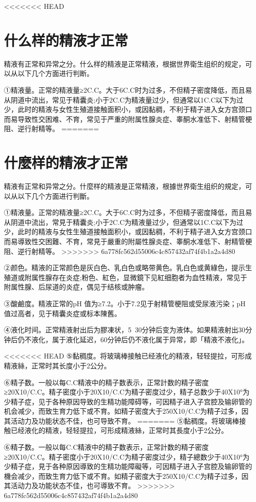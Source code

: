 \documentclass[12pt,UTF8]{ctexbook}
\begin{document}
<<<<<<< HEAD
\section{什么样的精液才正常}

精液有正常和异常之分。什么样的精液是正常精液，根据世界衛生组织的规定，可以从以下几个方面进行判断。

①精液量。正常的精液量≥2C.C。大于6C.C时为过多，不但精子密度降低，而且易从阴道中流出，常见于精囊炎;小于2C.C为精液量过少，但通常以1C.C以下为过少，此时的精液与女性生殖道接触面积小，或因黏稠，不利于精子进入女方宫颈口而易导致性交困难、不育，常见于严重的附属性腺炎症、睾酮水准低下、射精管梗阻、逆行射精等。
=======
\section{什麼样的精液才正常}

精液有正常和异常之分。什麼样的精液是正常精液，根據世界衛生组织的規定，可以从以下几个方面进行判斷。

①精液量。正常的精液量≥2C.C。大于6C.C时为过多，不但精子密度降低，而且易从阴道中流出，常見于精囊炎;小于2C.C为精液量过少，但通常以1C.C以下为过少，此时的精液与女性生殖道接触面积小，或因黏稠，不利于精子进入女方宫颈口而易導致性交困難、不育，常見于嚴重的附屬性腺炎症、睾酮水准低下、射精管梗阻、逆行射精等。
>>>>>>> 6a778fc562d55006c4c857432af74f4b1a2a4d80

②颜色。精液的正常颜色是灰白色、乳白色或略带黄色。乳白色或黄綠色，提示生殖道或附属性腺存在炎症;粉色、紅色，显微鏡下见紅细胞者为血性精液，常见于附属性腺、后尿道的炎症，偶见于结核或肿瘤。

③酸鹼度。精液正常的pH 值为≥7.2。小于7.2见于射精管梗阻或受尿液污染；pH值过高者，见于精囊炎症或标本陳舊。

④液化时间。正常精液射出后为膠凍状，5~30分钟后变为液体。如果精液射出30分钟后仍不液化，属于液化延迟，60分钟后仍不液化属于异常，即「精液不液化」。

<<<<<<< HEAD
⑤黏稠度。将玻璃棒接触已经液化的精液，轻轻提拉，可形成精液絲，正常时其长度小于2公分。

⑥精子数。一般以每C.C精液中的精子数表示，正常計数的精子密度≥20X10/C.C。精子密度小于20X10/C.C为精子密度过少，精子总数少于40X10°为少精子症，见于各种原因导致的生精功能障碍等，可因精子进入子宫腔及输卵管的机会减少，而致生育力低下或不育。如精子密度大于250X10/C.C为精子过多，因其活动力及功能状态不佳，也可导致不育。
=======
⑤黏稠度。将玻璃棒接触已经液化的精液，轻轻提拉，可形成精液絲，正常时其長度小于2公分。

⑥精子数。一般以每C.C精液中的精子数表示，正常計数的精子密度≥20X10/C.C。精子密度小于20X10/C.C为精子密度过少，精子總数少于40X10°为少精子症，見于各种原因導致的生精功能障礙等，可因精子进入子宫腔及输卵管的機会减少，而致生育力低下或不育。如精子密度大于250X10/C.C为精子过多，因其活动力及功能状态不佳，也可導致不育。
>>>>>>> 6a778fc562d55006c4c857432af74f4b1a2a4d80
\end{document}
